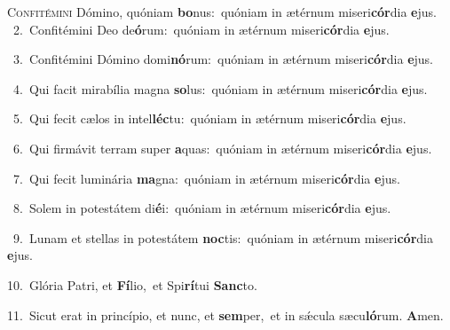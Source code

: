 \lettrine{\initial\textcolor{\initialcolor}{C}}{onfitémini} Dómino, quóniam \textbf{bo}\-nus:~\star quóniam in ætérnum miseri\-\textbf{cór}\-dia \textbf{e}\-jus.\\
{\numbfont\textcolor{\numbcolor}{~2.}}~Confitémini Deo de\-\textbf{ó}\-rum:~\star quóniam in ætérnum miseri\-\textbf{cór}\-dia \textbf{e}\-jus.\par
{\numbfont\textcolor{\numbcolor}{~3.}}~Confitémini Dómino domi\-\textbf{nó}\-rum:~\star quóniam in ætérnum miseri\-\textbf{cór}\-dia \textbf{e}\-jus.\par
{\numbfont\textcolor{\numbcolor}{~4.}}~Qui facit mirabília magna \textbf{so}\-lus:~\star quóniam in ætérnum miseri\-\textbf{cór}\-dia \textbf{e}\-jus.\par
{\numbfont\textcolor{\numbcolor}{~5.}}~Qui fecit cælos in intel\-\textbf{léc}\-tu:~\star quóniam in ætérnum miseri\-\textbf{cór}\-dia \textbf{e}\-jus.\par
{\numbfont\textcolor{\numbcolor}{~6.}}~Qui firmávit terram super \textbf{a}\-quas:~\star quóniam in ætérnum miseri\-\textbf{cór}\-dia \textbf{e}\-jus.\par
{\numbfont\textcolor{\numbcolor}{~7.}}~Qui fecit luminária \textbf{ma}\-gna:~\star quóniam in ætérnum miseri\-\textbf{cór}\-dia \textbf{e}\-jus.\par
{\numbfont\textcolor{\numbcolor}{~8.}}~Solem in potestátem di\-\textbf{é}\-i:~\star quóniam in ætérnum miseri\-\textbf{cór}\-dia \textbf{e}\-jus.\par
{\numbfont\textcolor{\numbcolor}{~9.}}~Lunam et stellas in potestátem \textbf{noc}\-tis:~\star quóniam in ætérnum miseri\-\textbf{cór}\-dia \textbf{e}\-jus.\par
{\numbfont\textcolor{\numbcolor}{10.}}~Glória Patri, et \textbf{Fí}\-lio,~\star et Spi\-\textbf{rí}\-tui \textbf{Sanc}\-to.\par
{\numbfont\textcolor{\numbcolor}{11.}}~Sicut erat in princípio, et nunc, et \textbf{sem}\-per,~\star et in sǽcula sæcu\-\textbf{ló}\-rum. \textbf{A}\-men.\par
